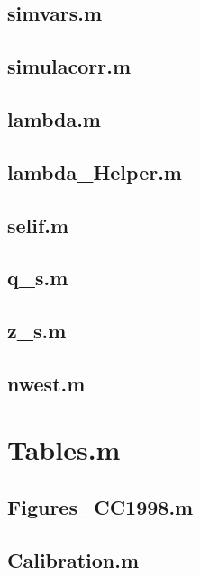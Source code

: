 \subsection{simvars.m}
\label{sec:app27}


\subsection{simulacorr.m}
\label{sec:app28}


\subsection{lambda.m}
\label{sec:app29}


\subsection{lambda_Helper.m}
\label{sec:app30}


\subsection{selif.m}
\label{sec:app31}


\subsection{q_s.m}
\label{sec:app32}


\subsection{z_s.m}
\label{sec:app33}



\subsection{nwest.m}
\label{sec:app34}


\section{Tables.m}
\label{sec:app35}


\subsection{Figures_CC1998.m}
\label{sec:app36}


\subsection{Calibration.m}
\label{sec:app37}



\begin{comment}
\end{comment}

